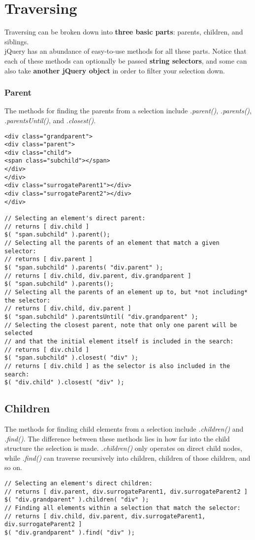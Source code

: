 \documentclass[10pt,letterpaper]{report}
\begin{document}
\section{Traversing}
Traversing can be broken down into \textbf{three basic parts}: parents, children, and siblings.\\
jQuery has an abundance of easy-to-use methods for all these parts. Notice that each of these methods can optionally be passed \textbf{string selectors}, and some can also take \textbf{another jQuery object} in order to filter your selection down.
\subsubsection{Parent}
The methods for finding the parents from a selection include \textit{.parent()}, \textit{.parents()}, \textit{.parentsUntil()}, and \textit{.closest()}.
\begin{lstlisting}
<div class="grandparent">
<div class="parent">
<div class="child">
<span class="subchild"></span>
</div>
</div>
<div class="surrogateParent1"></div>
<div class="surrogateParent2"></div>
</div>

// Selecting an element's direct parent:
// returns [ div.child ]
$( "span.subchild" ).parent();
// Selecting all the parents of an element that match a given selector:
// returns [ div.parent ]
$( "span.subchild" ).parents( "div.parent" );
// returns [ div.child, div.parent, div.grandparent ]
$( "span.subchild" ).parents();
// Selecting all the parents of an element up to, but *not including* the selector:
// returns [ div.child, div.parent ]
$( "span.subchild" ).parentsUntil( "div.grandparent" );
// Selecting the closest parent, note that only one parent will be selected
// and that the initial element itself is included in the search:
// returns [ div.child ]
$( "span.subchild" ).closest( "div" );
// returns [ div.child ] as the selector is also included in the search:
$( "div.child" ).closest( "div" );
\end{lstlisting}
\subsection{Children}
The methods for finding child elements from a selection include \textit{.children()} and \textit{.find()}. The difference between these methods lies in how far into the child structure the selection is made. \textit{.children()} only operates on direct child nodes, while \textit{.find()} can traverse recursively into children, children of those children, and so on.
\begin{lstlisting}
// Selecting an element's direct children:
// returns [ div.parent, div.surrogateParent1, div.surrogateParent2 ]
$( "div.grandparent" ).children( "div" );
// Finding all elements within a selection that match the selector:
// returns [ div.child, div.parent, div.surrogateParent1, div.surrogateParent2 ]
$( "div.grandparent" ).find( "div" );
\end{lstlisting}
\end{document}
